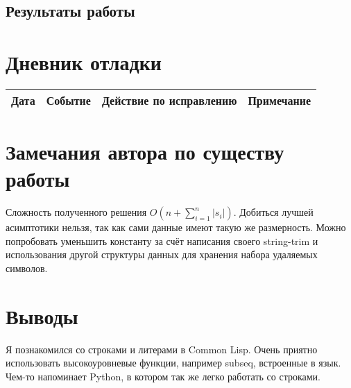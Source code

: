 \documentclass[12pt]{article}
\begin{document}
\pagebreak
\subsection{Результаты работы}


\pagebreak
\section{Дневник отладки}
\begin{tabular}{|p{50pt}|p{140pt}|p{140pt}|p{80pt}|}
\hline
Дата & Событие & Действие по исправлению & Примечание \\
\hline
\end{tabular}

\section{Замечания автора по существу работы}

Сложность полученного решения $O(n + \sum_{i=1}^n{|s_i|})$. Добиться лучшей асимптотики нельзя, так как сами данные имеют такую же размерность. Можно попробовать уменьшить константу за счёт написания своего string-trim и использования другой структуры данных для хранения набора удаляемых символов.

\section{Выводы}
Я познакомился со строками и литерами в Common Lisp. Очень приятно использовать высокоуровневые функции, например subseq, встроенные в язык. Чем-то напоминает Python, в котором так же легко работать со строками.
\end{document}
